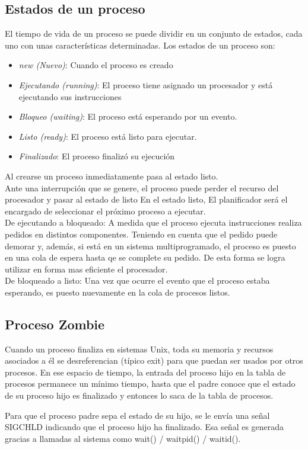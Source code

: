 \documentclass{article}
\begin{document}
	\subsection{Estados de un proceso}
	El tiempo de vida de un proceso se puede dividir en un conjunto de estados, cada uno con unas características determinadas.
	Los estados de un proceso son: 
	\begin{itemize}
		\item  \textit{new (Nuevo)}: Cuando el proceso es creado
		\item \textit{Ejecutando (running)}: El proceso tiene asignado un procesador y está ejecutando sus instrucciones
		\item  \textit{Bloqueo (waiting)}: El proceso está esperando por un evento.
		\item \textit{Listo (ready)}: El proceso está listo para ejecutar.
		\item \textit{Finalizado}: El proceso finalizó su ejecución
	\end{itemize}
	Al crearse un proceso inmediatamente pasa al estado listo.\\Ante una interrupción que se genere, el proceso puede perder el recurso del procesador y pasar al estado de listo En el estado listo, El planificador será el encargado de seleccionar el próximo proceso a ejecutar.\\De ejecutando a bloqueado: A medida que el proceso ejecuta instrucciones realiza pedidos en distintos componentes. Teniendo en cuenta que el pedido puede demorar y, además, si está en un sistema multiprogramado, el proceso es puesto en una cola de espera hasta qe se complete su pedido. De esta forma se logra utilizar en forma mas eficiente el procesador. \\De bloqueado a listo: Una vez que ocurre el evento que el proceso estaba esperando, es puesto nuevamente en la cola de procesos listos.
	\subsection{Proceso Zombie}
	Cuando un proceso finaliza en sistemas Unix, toda su memoria y recursos asociados a él se desreferencian (típico exit)
	para que puedan ser usados por otros procesos. En ese espacio de tiempo, la entrada del proceso hijo en la tabla de 
	procesos permanece un mínimo tiempo, hasta que el padre conoce que el estado de su proceso hijo es finalizado y entonces 
	lo saca de la tabla de procesos.
	
	Para que el proceso padre sepa el estado de su hijo, se le envía una señal SIGCHLD indicando que el proceso hijo ha
	finalizado. Esa señal es generada gracias a llamadas al sistema como wait() / waitpid() / waitid().
	
\end{document}
